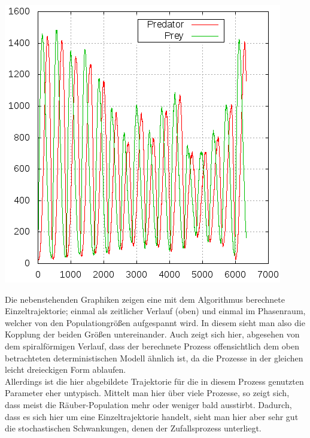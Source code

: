 \documentclass[11pt]{article}
\begin{document}
\begin{minipage}[b]{0.58\textwidth} 
\includegraphics[width=\textwidth]{Graphiken/ppm1timepop.png}
\end{minipage}
\hfill
\begin{minipage}[b]{0.39\textwidth}
Die nebenstehenden Graphiken zeigen eine mit dem Algorithmus berechnete Einzeltrajektorie; einmal als zeitlicher Verlauf (oben) und einmal im \glqq Phasenraum\grqq , welcher von den Populationgrößen aufgespannt wird. In diesem sieht man also die Kopplung der beiden Größen untereinander. 
Auch zeigt sich hier, abgesehen von dem spiralförmigen Verlauf, dass der berechnete Prozess offensichtlich dem oben betrachteten deterministischen Modell ähnlich ist, da die Prozesse in der gleichen leicht dreieckigen Form ablaufen.\\
Allerdings ist die hier abgebildete Trajektorie für die in diesem Prozess genutzten Parameter eher untypisch. Mittelt man hier über viele Prozesse, so zeigt sich, dass meist die Räuber-Population mehr oder weniger bald ausstirbt. Dadurch, dass es sich hier um eine Einzeltrajektorie handelt, sieht man hier aber sehr gut die stochastischen Schwankungen, denen der Zufallsprozess unterliegt.
\end{minipage}
\end{document}
